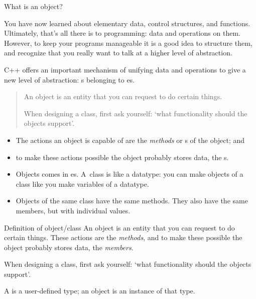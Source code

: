 
 {What is an object?}
\label{sec:object}

You have now learned about elementary data,
control structures,
and functions.
Ultimately, that's all there is to programming:
data and operations on them.
However, to keep your programs manageable
it is a good idea to structure them,
and recognize that you really want to talk at a higher level of abstraction.

C++ offers an important mechanism of unifying data and operations
to give a new level of abstraction:
s belonging to es.

\begin{mdframed}
  \begin{quotation}
    \noindent
    An object is an entity that you can request to do certain things.

    \noindent
    When designing a class, first ask yourself: `what functionality
    should the objects support'.
  \end{quotation}
\end{mdframed}

\begin{itemize}
\item
  The actions an object is capable of are the
  \emph{methods}
  or s of the object; and
\item to make these actions possible the object probably stores
  data, the
  s.
\item
  Objects comes in es. A~class is like a datatype:
  you can make objects of a class like you make variables of a datatype.
\item
  Objects of the same class have the same methods.
  They also have the same members, but with individual values.
\end{itemize}

\begin{slide}{Definition of object/class}
  \label{sl:object-def}
  An object is an entity that you can request to do certain
  things. These actions are the
  \emph{methods},
  and to make these possible the object probably stores
  data, the
  \emph{members}.

  When designing a class, first ask yourself: `what functionality
  should the objects support'.

  A  is a user-defined type;
  an object is an instance of that type.
\end{slide}

